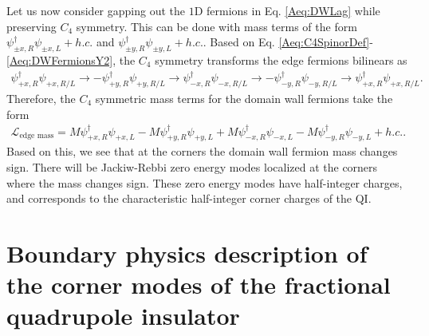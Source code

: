 \documentclass[%
 reprint,
 amsmath,amssymb,
 aps,
]{revtex4-1}
\begin{document}
\begin{appendix}
Let us now consider gapping out the $1$D fermions in Eq. \ref{Aeq:DWLag} while preserving $C_4$ symmetry. This can be done with mass terms of the form $ \psi^\dagger_{\pm x,R} \psi_{\pm x,L} + h.c.$ and $ \psi^\dagger_{\pm y,R} \psi_{\pm y,L} + h.c.$. Based on Eq. \ref{Aeq:C4SpinorDef}-\ref{Aeq:DWFermionsY2}, the $C_4$ symmetry transforms the edge fermions bilinears as 
\begin{equation}\begin{split}
   \psi^\dagger_{+x,R} \psi_{+x,R/L} \rightarrow -\psi^\dagger_{+y,R} \psi_{+y,R/L}\rightarrow \psi^\dagger_{-x,R} \psi_{-x,R/L} \rightarrow -\psi^\dagger_{-y,R} \psi_{-y,R/L} \rightarrow \psi^\dagger_{+x,R} \psi_{+x,R/L}.
\end{split}\end{equation}
 Therefore, the $C_4$ symmetric mass terms for the domain wall fermions take the form
\begin{equation}\begin{split}
\mathcal{L}_{\text{edge mass}} =  M\psi^\dagger_{+x,R} \psi_{+x,L} - M\psi^\dagger_{+ y,R} \psi_{+y,L} + M\psi^\dagger_{-x,R} \psi_{-x,L} - M\psi^\dagger_{-y,R} \psi_{-y,L} + h.c..
\label{Aeq:DWLagMass}\end{split}\end{equation}
Based on this, we see that at the corners the domain wall fermion mass changes sign. There will be Jackiw-Rebbi zero energy modes localized at the corners where the mass changes sign. These zero energy modes have half-integer charges, and corresponds to the characteristic half-integer corner charges of the QI. 






\section{Boundary physics description of the corner modes of the fractional quadrupole insulator}\label{app:FQIBound}


\end{appendix}
\end{document}
